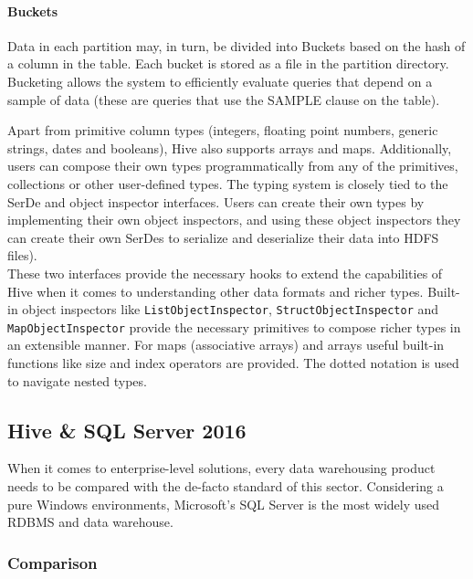 \paragraph{Buckets} Data in each partition may, in turn, be divided into Buckets based on the hash of a column in the table. Each bucket is stored as a file in the partition directory. Bucketing allows the system to efficiently evaluate queries that depend on a sample of data (these are queries that use the SAMPLE clause on the table).
\newline
\par
Apart from primitive column types (integers, floating point numbers, generic strings, dates and booleans), Hive also supports arrays and maps. Additionally, users can compose their own types programmatically from any of the primitives, collections or other user-defined types. The typing system is closely tied to the SerDe and object inspector interfaces. Users can create their own types by implementing their own object inspectors, and using these object inspectors they can create their own SerDes to serialize and deserialize their data into HDFS files).\\
These two interfaces provide the necessary hooks to extend the capabilities of Hive when it comes to understanding other data formats and richer types. Built-in object inspectors like \verb|ListObjectInspector|, \verb|StructObjectInspector| and \verb|MapObjectInspector| provide the necessary primitives to compose richer types in an extensible manner. For maps (associative arrays) and arrays useful built-in functions like size and index operators are provided. The dotted notation is used to navigate nested types.

\subsection{Hive \& SQL Server 2016}

When it comes to enterprise-level solutions, every data warehousing product needs to be compared with the de-facto standard of this sector. Considering a pure Windows environments, Microsoft's SQL Server is the most widely used RDBMS and data warehouse.\newline

\subsubsection{Comparison}

